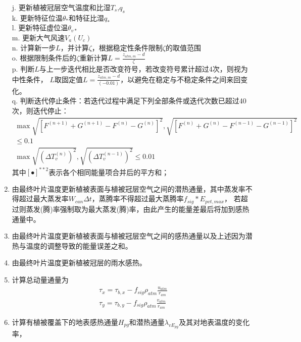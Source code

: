\begin{enumerate}
    j. 更新植被冠层空气温度和比湿$T_s$,$q_s$ \\ 
    k. 更新特征位温$\theta_\ast$和特征比湿$q_\ast$ \\
    l. 更新特征虚位温$\theta_{v\ast}$ \\
    m. 更新大气风速$V_a\left(U_c\right)$ \\
    n. 计算新一步$L$，并计算$\zeta$，根据稳定性条件限制$\zeta$的取值范围 \\
    o. 根据限制条件后的$\zeta$重新计算$L=\frac{z_{atm,m}-d}{\zeta}$ \\
    p. 判断$L$与上一步迭代相比是否改变符号，若改变符号累计超过4次，则视为中性条件，
    $L$取固定值$L=\frac{z_{atm,m}-d}{\left(-0.01\right)}$，以避免在稳定与不稳定条件之间来回变化。\\
    q. 判断迭代停止条件：若迭代过程中满足下列全部条件或迭代次数已超过40次，则迭代停止：
    \begin{equation}
        \begin{array}{c}\max \sqrt{\left[F^{(n+1)}+G^{(n+1)}-F^{(n)}-G^{(n)}\right]^{2}}, \sqrt{\left[F^{(n)}+G^{(n)}-F^{(n-1)}-G^{(n-1)}\right]^{2}} \\ \leq 0.1 \\ \max \sqrt{\left(\Delta T_{v}^{(n)}\right)^{2}}, \sqrt{\left(\Delta T_{v}^{(n-1)}\right)^{2}} \leq 0.01\end{array}
    \end{equation}
    其中$\left[\bullet\right]^{\ast\ast2}$表示各个相同能量项合并后的平方和；
    \item 由最终叶片温度更新植被表面与植被冠层空气之间的潜热通量，其中蒸发率不得超过最大蒸发率$W_{can} \Delta t$，蒸腾率不得超过最大蒸腾率$f_{sig}\ast E_{pvt,max}$，
    若超过则蒸发(腾)率强制取为最大蒸发(腾)率，由此产生的能量差最后将加到感热通量中。
    \item 由最终叶片温度更新植被表面与植被冠层空气之间的感热通量以及上述因为潜热与温度的调整导致的能量误差之和。
    \item 由最终叶片温度更新植被冠层的雨水感热。
    \item 计算总动量通量为
    \begin{equation}
    \begin{array}{c}\tau_{x}=\tau_{b,x}-f_{sig} \rho_{atm} \frac{u_{atm}}{r_{a m}} \\ 
        \tau_{y}=\tau_{b,y}-f_{sig} \rho_{atm} \frac{v_{atm}}{r_{am}}\end{array}
    \end{equation}
    \item 计算有植被覆盖下的地表感热通量$H_{pg}$和潜热通量$\lambda_{vE_{pg}}$及其对地表温度的变化率，

\end{enumerate}
